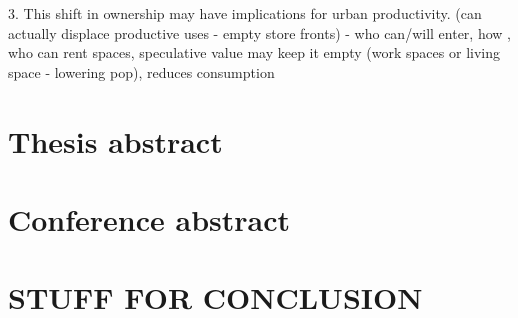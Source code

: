 3. This shift in ownership may have implications for urban productivity. (can actually displace productive uses - empty store fronts) - who can/will enter, how , who can rent spaces, speculative value may keep it empty (work spaces or living space - lowering pop), reduces consumption

\section{Thesis abstract}

\section{Conference abstract}


\section{STUFF FOR CONCLUSION}




